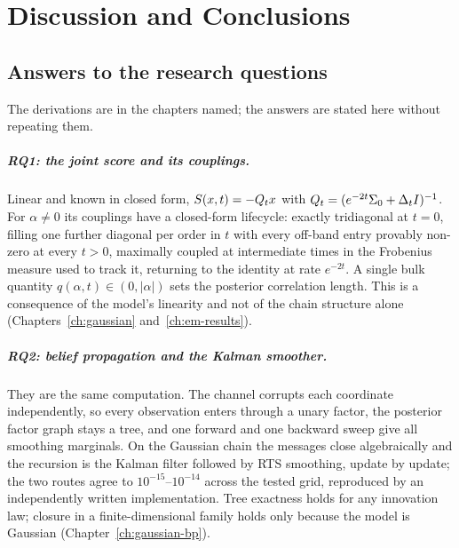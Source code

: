 \chapter{Discussion and Conclusions}\label{ch:conclusions}

\section{Answers to the research questions}\label{sec:conclusions-findings}

The derivations are in the chapters named; the answers are stated here without
repeating them.

\paragraph{RQ1: the joint score and its couplings.} Linear and known in closed
form, $S(x,t) = -Q_t x$ with $Q_t = (e^{-2t}\Sigma_0 + \Delta_t I)^{-1}$. For
$\alpha \neq 0$ its
couplings have a closed-form lifecycle: exactly tridiagonal at $t=0$, filling
one further diagonal per order in $t$ with every off-band entry provably
non-zero at every $t > 0$, maximally coupled at intermediate times in the
Frobenius measure used to track it,
returning to the identity at rate $e^{-2t}$. A single bulk quantity
$q(\alpha,t) \in (0,|\alpha|)$ sets the posterior correlation length. This is a
consequence of the model's linearity and not of the chain structure alone
(Chapters~\ref{ch:gaussian} and~\ref{ch:em-results}).

\paragraph{RQ2: belief propagation and the Kalman smoother.} They are the same
computation. The channel corrupts each coordinate independently, so every
observation enters through a unary factor, the posterior factor graph stays a
tree, and one forward and one backward sweep give all smoothing marginals. On
the Gaussian chain the messages close algebraically and the recursion is the
Kalman filter followed by RTS smoothing, update by update; the two routes agree
to $10^{-15}$--$10^{-14}$ across the tested grid, reproduced by an independently
written implementation. Tree exactness holds for any innovation law; closure in
a finite-dimensional family holds only because the model is Gaussian
(Chapter~\ref{ch:gaussian-bp}).

